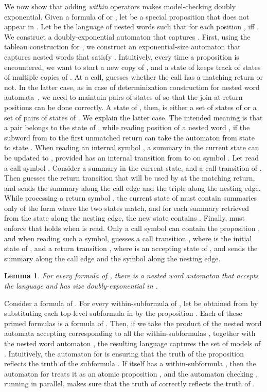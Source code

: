 \documentclass{LMCS}
\theoremstyle{plain}
\newtheorem{lemma}[theorem]{Lemma}
\theoremstyle{definition}
\begin{document}
We now show that adding {\em within} operators makes model-checking
doubly exponential. 
Given a formula  of  or , let  be a special
proposition that does not appear in . Let  be the
language of nested words  such that for each position ,
 iff .  We 
construct a doubly-exponential automaton 
that captures  .  
First, using the tableau construction for ,
we construct an exponential-size automaton  
that captures nested words that satisfy .
Intuitively, every time a proposition  is encountered,
we want to start a new copy of , and a state of  keeps track of
states of multiple copies of . 
At a call,  guesses whether the call has a matching return or not.
In the latter case, 
as in case of determinization
construction for nested word automata~\cite{nested}, 
we need to 
maintain pairs of states of  so that the join at return positions
can be done correctly.
A state of , then, is either a set of states of  or a set of pairs
of states of . We explain the latter case.
The intended meaning is that a
pair  belongs to the state of , while reading position 
of a nested word , if the subword from  to the first unmatched return
can take the automaton  from state  to state . 
When reading an internal symbol , a summary  in the current state
can be updated to , provided  has an internal transition from  to
 on symbol . Let  read a call symbol .
Consider a summary  in the current state, and a call-transition 
 of . Then  guesses the return transition  that will
be used by  at the matching return, and sends the summary
 along the call edge and the triple  along the nesting edge.
While processing a return symbol , the current state of  must contain
summaries only of the form  where the two states match, and
for each summary  retrieved from the state along the nesting edge,
the new state contains .
Finally,  must enforce that  holds when  is read.
Only a call symbol  can contain 
the proposition 
, and when reading
such a symbol,  guesses a call transition , where  is the initial
state of , and a return transition , 
where  is an accepting state of ,
and sends the summary  along the call edge and 
the symbol  along the nesting edge.




\begin{lemma}
For every formula  of , there is a nested word automaton
that accepts the language  and has size doubly-exponential
in .
\end{lemma}


Consider a formula  of .
For every within-subformula  of
,   
let  be obtained from  by
substituting each top-level subformula  in  by the
proposition .  
Each of these primed
formulas is a formula of .  Then, if we take the product of the
nested word automata accepting  corresponding to all the
within-subformulas , together with the nested word automaton
, the resulting language captures the set of
models of .  Intuitively, the automaton for  is
ensuring that the truth of the proposition  reflects the truth
of the subformula .  If  itself has a within-subformula
, then the automaton for  treats it as an
atomic proposition , and the automaton checking ,
running in parallel, makes sure that the truth of  correctly
reflects the truth of .
\end{document}
